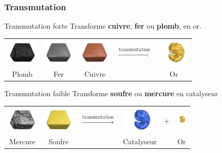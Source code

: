 \documentclass{beamer}
\begin{document}
\begin{frame}
    \frametitle{Transmutation}
    \begin{block}{Transmutation forte}
        Transforme \textbf{cuivre}, \textbf{fer} ou \textbf{plomb}, en or.
        \\
        \begin{tabular}{ccccc}
            \includegraphics[width=1.5cm]{../img/material-lead} &
            \includegraphics[width=1.5cm]{../img/material-iron} &
            \includegraphics[width=1.5cm]{../img/material-copper} &
            $\xrightarrow{\text{transmutation}}$ &
            \includegraphics[width=1.5cm]{../img/material-gold}\\
            Plomb & Fer & Cuivre & & Or
        \end{tabular}
    \end{block}
    \begin{block}{Transmutation faible}
        Transforme \textbf{soufre} ou \textbf{mercure} en catalyseur
        \\
        \begin{tabular}{cccccc}
            \includegraphics[width=1.5cm]{../img/material-mercury} &
            \includegraphics[width=1.5cm]{../img/material-sulfur} &
            $\xrightarrow{\text{transmutation}}$ &
            \includegraphics[width=1.5cm]{../img/material-catalyst} &
            + &
            \includegraphics[width=0.5cm]{../img/material-gold}\\
            Mercure & Soufre & & Catalyseur & & Or\\
        \end{tabular}
    \end{block}
\end{frame}
\end{document}

